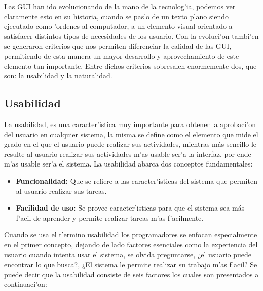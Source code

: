 Las GUI han ido evolucionando de la mano de la tecnolog'ia, podemos ver claramente esto en su historia, cuando se pas'o de un texto plano siendo ejecutado como 'ordenes al computador, a un elemento visual orientado a satisfacer distintos tipos de necesidades de los usuario. Con la evoluci'on tambi'en se generaron criterios que nos permiten diferenciar la calidad de las GUI, permitiendo de esta manera un mayor desarrollo y aprovechamiento de este elemento tan importante.
Entre dichos criterios sobresalen enormemente dos, que son: la usabilidad  y la naturalidad.

\subsection{Usabilidad}
La usabilidad, es una caracter'istica muy importante para obtener la aprobaci'on del usuario en cualquier sistema, la misma se define como el elemento que mide el grado en el que el usuario puede realizar sus actividades, mientras más sencillo le resulte al usuario realizar sus actividades m'as usable ser'a la interfaz, por ende m'as usable ser'a el sistema. 
La usabilidad abarca dos conceptos fundamentales:

\begin{itemize}
	\item \textbf{Funcionalidad:} Que se refiere a las caracter'isticas del sistema que permiten al usuario realizar sus tareas.

	\item \textbf{Facilidad de uso:} Se provee caracter'isticas para que el sistema sea más f'acil de aprender y permite realizar tareas m'as f'acilmente.

\end{itemize}

\medskip
Cuando se usa el t'ermino usabilidad los programadores se enfocan especialmente en el primer concepto, dejando de lado factores esenciales como la experiencia del usuario cuando intenta usar el sistema, se olvida preguntarse, ¿el usuario puede encontrar lo que busca?, ¿El sistema le permite realizar su trabajo m'as f'acil?
Se puede decir que la usabilidad consiste de seis factores los cuales son presentados a continuaci'on:

